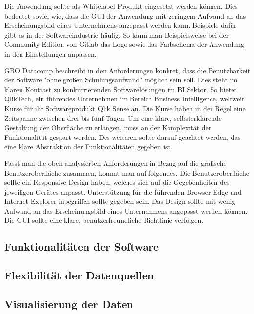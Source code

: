 Die Anwendung sollte als Whitelabel Produkt eingesetzt werden können. Dies bedeutet soviel wie,
dass die GUI der Anwendung mit geringem Aufwand an das Erscheinungsbild eines Unternehmens angepasst
werden kann. Beispiele dafür gibt es in der Softwareindustrie häufig. So kann man Beispielsweise bei
der Community Edition von Gitlab das Logo sowie das Farbschema der Anwendung in den Einstellungen
anpassen.\cite{GitlabDocs}

GBO Datacomp beschreibt in den Anforderungen konkret, dass die Benutzbarkeit der Software
"ohne großen Schulungsaufwand" möglich sein soll. \cite{GBODatacompHandbuchDashboard}
Dies steht im klaren Kontrast zu konkurrierenden Softwarelösungen im BI Sektor.
So bietet QlikTech, ein führendes Unternehmen im Bereich Business Intelligence,
weltweit Kurse für ihr Softwareprodukt Qlik Sense an. Die Kurse haben in der
Regel eine Zeitspanne zwischen drei bis fünf Tagen.\cite{QlikSenseTraining}
Um eine klare, selbsterklärende Gestaltung der Oberfläche zu erlangen,
muss an der Komplexität der Funktionalität gespart werden. Des weiteren
sollte darauf geachtet werden, das eine klare Abstraktion der Funktionalitäten
gegeben ist. 

Fasst man die oben analysierten Anforderungen in Bezug auf die grafische Benutzeroberfläche
zusammen, kommt man auf folgendes. Die Benutzeroberfläche sollte ein Responsive Design
haben, welches sich auf die Gegebenheiten des jeweiligen Gerätes anpasst. Unterstützung
für die führenden Browser Edge und Internet Explorer inbegriffen sollte gegeben sein.
Das Design sollte mit wenig Aufwand an das Erscheinungsbild eines Unternehmens angepasst werden
können. Die GUI sollte eine klare, benutzerfreundliche Richtlinie verfolgen.

\subsection{Funktionalitäten der Software}

\subsection{Flexibilität der Datenquellen}

\subsection{Visualisierung der Daten}

